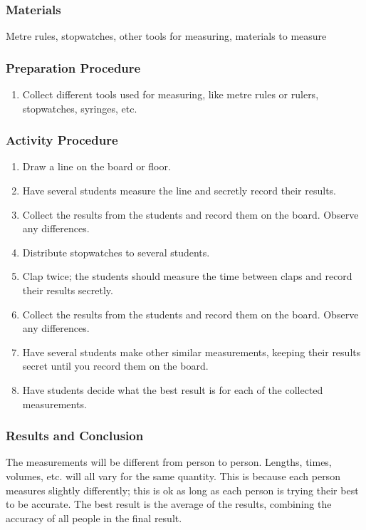 \subsubsection*{Materials}
Metre rules, stopwatches, other tools for measuring, materials to measure

\subsubsection*{Preparation Procedure}
\begin{enumerate}
\item{Collect different tools used for measuring, like metre rules or rulers, stopwatches, syringes, etc.}
\end{enumerate}

\subsubsection*{Activity Procedure}
\begin{enumerate}
\item{Draw a line on the board or floor.}
\item{Have several students measure the line and secretly record their results.}
\item{Collect the results from the students and record them on the board.  Observe any differences.}
\item{Distribute stopwatches to several students.}
\item{Clap twice; the students should measure the time between claps and record their results secretly.}
\item{Collect the results from the students and record them on the board.  Observe any differences.}
\item{Have several students make other similar measurements, keeping their results secret until you record them on the board.}
\item{Have students decide what the best result is for each of the collected measurements.}
\end{enumerate}

\subsubsection*{Results and Conclusion}
The measurements will be different from person to person.  Lengths, times, volumes, etc. will all vary for the same quantity.  This is because each person measures slightly differently; this is ok as long as each person is trying their best to be accurate.  The best result is the average of the results, combining the accuracy of all people in the final result.

